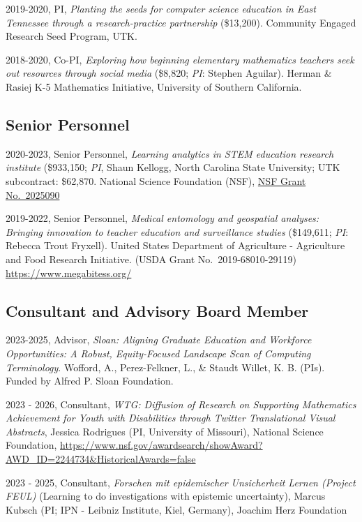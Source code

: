 \documentclass[
  14,
]{article}
\begin{document}
2019-2020, PI, \emph{Planting the seeds for computer science education
in East Tennessee through a research-practice partnership} (\$13,200).
Community Engaged Research Seed Program, UTK.

2018-2020, Co-PI, \emph{Exploring how beginning elementary mathematics
teachers seek out resources through social media} (\$8,820; \emph{PI}:
Stephen Aguilar). Herman \& Rasiej K-5 Mathematics Initiative,
University of Southern California.

\hypertarget{senior-personnel}{%
\subsection{Senior Personnel}\label{senior-personnel}}

2020-2023, Senior Personnel, \emph{Learning analytics in STEM education
research institute} (\$933,150; \emph{PI}, Shaun Kellogg, North Carolina
State University; UTK subcontract: \$62,870. National Science Foundation
(NSF),
\href{https://www.nsf.gov/awardsearch/showAward?AWD_ID=2025090\&HistoricalAwards=false}{NSF
Grant No.~2025090}

2019-2022, Senior Personnel, \emph{Medical entomology and geospatial
analyses: Bringing innovation to teacher education and surveillance
studies} (\$149,611; \emph{PI}: Rebecca Trout Fryxell). United States
Department of Agriculture - Agriculture and Food Research Initiative.
(USDA Grant No.~2019-68010-29119) \url{https://www.megabitess.org/}

\hypertarget{consultant-and-advisory-board-member}{%
\subsection{Consultant and Advisory Board
Member}\label{consultant-and-advisory-board-member}}

2023-2025, Advisor, \emph{Sloan: Aligning Graduate Education and
Workforce Opportunities: A Robust, Equity-Focused Landscape Scan of
Computing Terminology}. Wofford, A., Perez-Felkner, L., \& Staudt
Willet, K. B. (PIs). Funded by Alfred P. Sloan Foundation.

2023 - 2026, Consultant, \emph{WTG: Diffusion of Research on Supporting
Mathematics Achievement for Youth with Disabilities through Twitter
Translational Visual Abstracts}, Jessica Rodrigues (PI, University of
Missouri), National Science Foundation,
\url{https://www.nsf.gov/awardsearch/showAward?AWD_ID=2244734\&HistoricalAwards=false}

2023 - 2025, Consultant, \emph{Forschen mit epidemischer Unsicherheit
Lernen (Project FEUL)} (Learning to do investigations with epistemic
uncertainty), Marcus Kubsch (PI; IPN - Leibniz Institute, Kiel,
Germany), Joachim Herz Foundation
\end{document}
